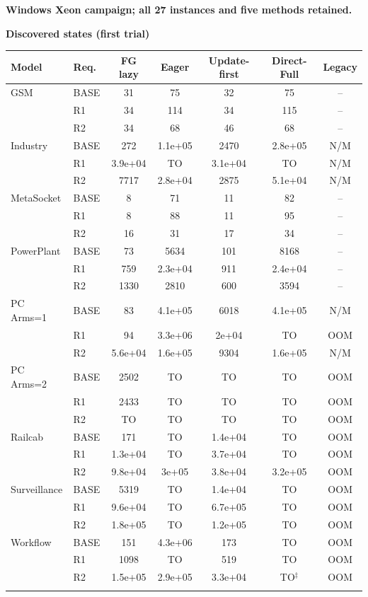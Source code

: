 \noindent\textbf{Windows Xeon campaign; all 27 instances and five methods retained.}\par
\clearpage\noindent\textbf{Discovered states (first trial)}\par\smallskip
\begingroup\scriptsize\setlength{\tabcolsep}{3pt}
\begin{tabular}{@{}llccccc@{}}
\toprule
Model & Req. & FG lazy & Eager & Update-first & Direct-Full & Legacy\\
\midrule
GSM & BASE & 31 & 75 & 32 & 75 & --\\
 & R1 & 34 & 114 & 34 & 115 & --\\
 & R2 & 34 & 68 & 46 & 68 & --\\
\addlinespace[2pt]
Industry & BASE & 272 & 1.1e+05 & 2470 & 2.8e+05 & N/M\\
 & R1 & 3.9e+04 & TO & 3.1e+04 & TO & N/M\\
 & R2 & 7717 & 2.8e+04 & 2875 & 5.1e+04 & N/M\\
\addlinespace[2pt]
MetaSocket & BASE & 8 & 71 & 11 & 82 & --\\
 & R1 & 8 & 88 & 11 & 95 & --\\
 & R2 & 16 & 31 & 17 & 34 & --\\
\addlinespace[2pt]
PowerPlant & BASE & 73 & 5634 & 101 & 8168 & --\\
 & R1 & 759 & 2.3e+04 & 911 & 2.4e+04 & --\\
 & R2 & 1330 & 2810 & 600 & 3594 & --\\
\addlinespace[2pt]
PC Arms=1 & BASE & 83 & 4.1e+05 & 6018 & 4.1e+05 & N/M\\
 & R1 & 94 & 3.3e+06 & 2e+04 & TO & OOM\\
 & R2 & 5.6e+04 & 1.6e+05 & 9304 & 1.6e+05 & N/M\\
\addlinespace[2pt]
PC Arms=2 & BASE & 2502 & TO & TO & TO & OOM\\
 & R1 & 2433 & TO & TO & TO & OOM\\
 & R2 & TO & TO & TO & TO & OOM\\
\addlinespace[2pt]
Railcab & BASE & 171 & TO & 1.4e+04 & TO & OOM\\
 & R1 & 1.3e+04 & TO & 3.7e+04 & TO & OOM\\
 & R2 & 9.8e+04 & 3e+05 & 3.8e+04 & 3.2e+05 & OOM\\
\addlinespace[2pt]
Surveillance & BASE & 5319 & TO & 1.4e+04 & TO & OOM\\
 & R1 & 9.6e+04 & TO & 6.7e+05 & TO & OOM\\
 & R2 & 1.8e+05 & TO & 1.2e+05 & TO & OOM\\
\addlinespace[2pt]
Workflow & BASE & 151 & 4.3e+06 & 173 & TO & OOM\\
 & R1 & 1098 & TO & 519 & TO & OOM\\
 & R2 & 1.5e+05 & 2.9e+05 & 3.3e+04 & TO$^{\ddagger}$ & OOM\\
\addlinespace[2pt]
\bottomrule
\end{tabular}\endgroup


